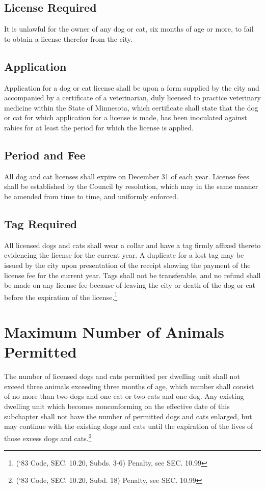\subsection{License Required}
It is unlawful for the owner of any dog or cat, six months of age or more, to fail to obtain a license therefor from the city.
\subsection{Application}
Application for a dog or cat license shall be upon a form supplied by the city and accompanied by a certificate of a veterinarian, duly licensed to practice veterinary medicine within the State of Minnesota, which certificate shall state that the dog or cat for which application for a license is made, has been inoculated against rabies for at least the period for which the license is applied.
\subsection{Period and Fee}
All dog and cat licenses shall expire on December 31 of each year.  License fees shall be established by the Council by resolution, which may in the same manner be amended from time to time, and uniformly enforced.
\subsection{Tag Required}
All licensed dogs and cats shall wear a collar and have a tag firmly affixed thereto evidencing the license for the current year.  A duplicate for a lost tag may be issued by the city upon presentation of the receipt showing the payment of the license fee for the current year.  Tags shall not be transferable, and no refund shall be made on any license fee because of leaving the city or death of the dog or cat before the expiration of the license.\footnote{(‘83 Code, SEC. 10.20, Subds. 3-6)  Penalty, see SEC. 10.99}

\section{Maximum Number of Animals Permitted}
The number of licensed dogs and cats permitted per dwelling unit shall not exceed three animals exceeding three months of age, which number shall consist of no more than two dogs and one cat or two cats and one dog. Any existing dwelling unit which becomes nonconforming on the effective date of this subchapter shall not have the number of permitted dogs and cats enlarged, but may continue with the existing dogs and cats until the expiration of the lives of those excess dogs and cats.\footnote{(‘83 Code, SEC. 10.20, Subd. 18)  Penalty, see SEC. 10.99}

